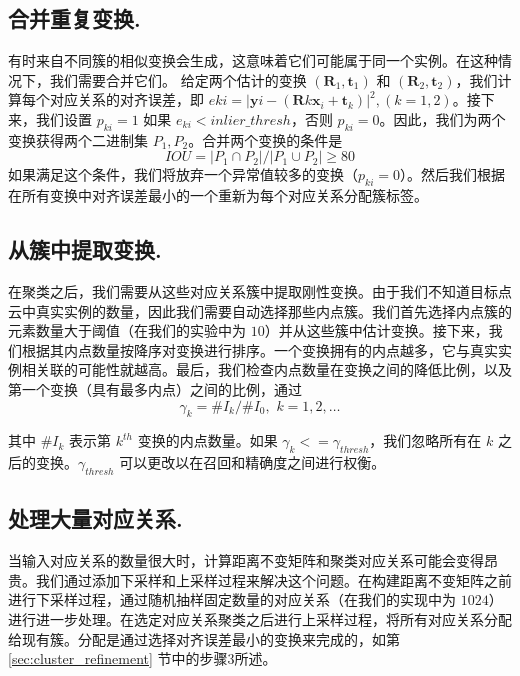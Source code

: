 \subsection{合并重复变换.}
有时来自不同簇的相似变换会生成，这意味着它们可能属于同一个实例。在这种情况下，我们需要合并它们。
给定两个估计的变换 $(\mathbf{R}_1, \mathbf{t}_1)$ 和 $(\mathbf{R}_2, \mathbf{t}_2)$，我们计算每个对应关系的对齐误差，即 $e{ki} = |\mathbf{y}{i}-(\mathbf{R}k \mathbf{x}_{i} + \mathbf{t}_k)|^2, (k = 1,2)$。接下来，我们设置 $p_{ki} = 1$ 如果 $e_{ki} < inlier\_thresh$，否则 $p_{ki}=0$。因此，我们为两个变换获得两个二进制集 $P_1, P_2$。合并两个变换的条件是
\begin{equation}
IOU = |P_1 \cap P_2|/|P_1 \cup P_2| \geq 80%
\label{eq:iou}
\end{equation}
如果满足这个条件，我们将放弃一个异常值较多的变换（$p_{ki} = 0$）。然后我们根据在所有变换中对齐误差最小的一个重新为每个对应关系分配簇标签。

\subsection{从簇中提取变换.}
在聚类之后，我们需要从这些对应关系簇中提取刚性变换。由于我们不知道目标点云中真实实例的数量，因此我们需要自动选择那些内点簇。我们首先选择内点簇的元素数量大于阈值（在我们的实验中为 $10$）并从这些簇中估计变换。接下来，我们根据其内点数量按降序对变换进行排序。一个变换拥有的内点越多，它与真实实例相关联的可能性就越高。最后，我们检查内点数量在变换之间的降低比例，以及第一个变换（具有最多内点）之间的比例，通过
\begin{equation}
    \gamma_k = \#I_{k}/\#I_{0},\,\, k = 1,2,\ldots
\end{equation}

其中 $\#I_k$ 表示第 $k^{th}$ 变换的内点数量。如果 $\gamma_k <= \gamma_{thresh}$，我们忽略所有在 $k$ 之后的变换。$\gamma_{thresh}$ 可以更改以在召回和精确度之间进行权衡。

\subsection{处理大量对应关系.}
当输入对应关系的数量很大时，计算距离不变矩阵和聚类对应关系可能会变得昂贵。我们通过添加下采样和上采样过程来解决这个问题。在构建距离不变矩阵之前进行下采样过程，通过随机抽样固定数量的对应关系（在我们的实现中为 $1024$）进行进一步处理。在选定对应关系聚类之后进行上采样过程，将所有对应关系分配给现有簇。分配是通过选择对齐误差最小的变换来完成的，如第 \ref{sec:cluster_refinement} 节中的步骤3所述。

